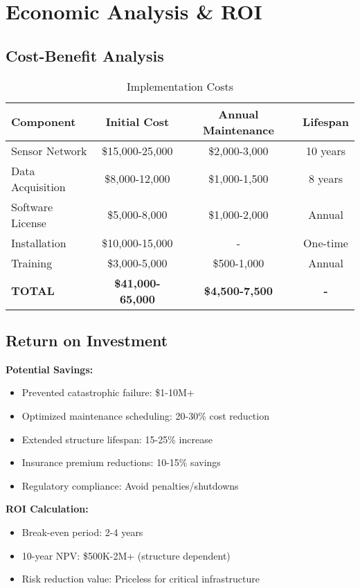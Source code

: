 \documentclass[12pt,a4paper]{article}
\begin{document}
\section{Economic Analysis \& ROI}

\subsection{Cost-Benefit Analysis}

\begin{table}[H]
\centering
\caption{Implementation Costs}
\begin{tabular}{@{}lccc@{}}
\toprule
\textbf{Component} & \textbf{Initial Cost} & \textbf{Annual Maintenance} & \textbf{Lifespan} \\
\midrule
Sensor Network & \$15,000-25,000 & \$2,000-3,000 & 10 years \\
Data Acquisition & \$8,000-12,000 & \$1,000-1,500 & 8 years \\
Software License & \$5,000-8,000 & \$1,000-2,000 & Annual \\
Installation & \$10,000-15,000 & - & One-time \\
Training & \$3,000-5,000 & \$500-1,000 & Annual \\
\midrule
\textbf{TOTAL} & \textbf{\$41,000-65,000} & \textbf{\$4,500-7,500} & \textbf{-} \\
\bottomrule
\end{tabular}
\end{table}

\subsection{Return on Investment}

\textbf{Potential Savings:}
\begin{itemize}
    \item Prevented catastrophic failure: \$1-10M+
    \item Optimized maintenance scheduling: 20-30\% cost reduction
    \item Extended structure lifespan: 15-25\% increase
    \item Insurance premium reductions: 10-15\% savings
    \item Regulatory compliance: Avoid penalties/shutdowns
\end{itemize}

\textbf{ROI Calculation:}
\begin{itemize}
    \item Break-even period: 2-4 years
    \item 10-year NPV: \$500K-2M+ (structure dependent)
    \item Risk reduction value: Priceless for critical infrastructure
\end{itemize}
\end{document}
